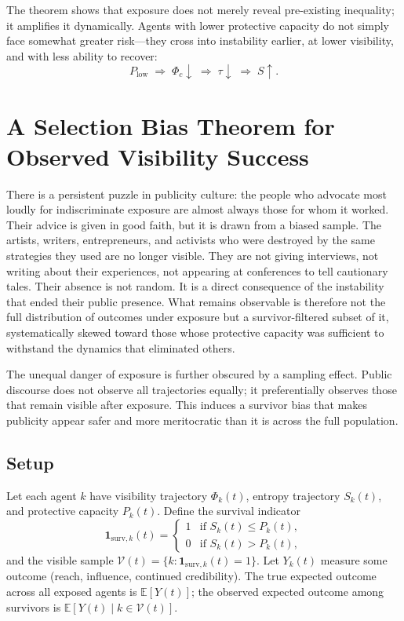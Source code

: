 \documentclass[12pt,a4paper]{article}
\begin{document}
The theorem shows that exposure does not merely reveal pre-existing inequality; it amplifies it dynamically. Agents with lower protective capacity do not simply face somewhat greater risk---they cross into instability earlier, at lower visibility, and with less ability to recover:
\[
P_{\text{low}} \;\Rightarrow\; \Phi_c \downarrow \;\Rightarrow\; \tau \downarrow \;\Rightarrow\; S \uparrow.
\]

\section{A Selection Bias Theorem for Observed Visibility Success}

There is a persistent puzzle in publicity culture: the people who advocate most loudly for indiscriminate exposure are almost always those for whom it worked. Their advice is given in good faith, but it is drawn from a biased sample. The artists, writers, entrepreneurs, and activists who were destroyed by the same strategies they used are no longer visible. They are not giving interviews, not writing about their experiences, not appearing at conferences to tell cautionary tales. Their absence is not random. It is a direct consequence of the instability that ended their public presence. What remains observable is therefore not the full distribution of outcomes under exposure but a survivor-filtered subset of it, systematically skewed toward those whose protective capacity was sufficient to withstand the dynamics that eliminated others.

The unequal danger of exposure is further obscured by a sampling effect. Public discourse does not observe all trajectories equally; it preferentially observes those that remain visible after exposure. This induces a survivor bias that makes publicity appear safer and more meritocratic than it is across the full population.

\subsection{Setup}

Let each agent $k$ have visibility trajectory $\Phi_k(t)$, entropy trajectory $S_k(t)$, and protective capacity $P_k(t)$. Define the survival indicator
\[
\mathbf{1}_{\mathrm{surv},k}(t)
=
\begin{cases}
1 & \text{if } S_k(t) \leq P_k(t),\\
0 & \text{if } S_k(t) > P_k(t),
\end{cases}
\]
and the visible sample $\mathcal{V}(t)=\{k : \mathbf{1}_{\mathrm{surv},k}(t)=1\}$. Let $Y_k(t)$ measure some outcome (reach, influence, continued credibility). The true expected outcome across all exposed agents is $\mathbb{E}[Y(t)]$; the observed expected outcome among survivors is $\mathbb{E}[Y(t)\mid k\in \mathcal{V}(t)]$.
\end{document}
